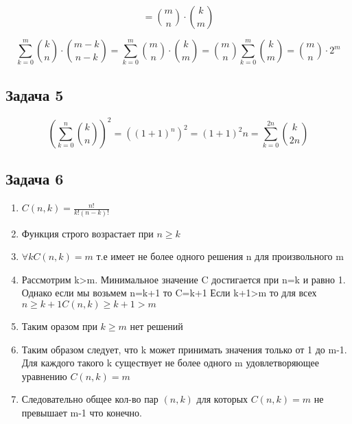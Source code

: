 \documentclass[a4paper,12pt]{article}
\begin{document}
\[
=\binom{m}{n}\cdot \binom{k}{m}
\]

\[
\sum_{k=0}^{m} \binom{k}{n}\cdot\binom{m-k}{n-k} = \sum_{k=0}^{m} \binom{m}{n}\cdot \binom{k}{m} = \binom{m}{n} \sum_{k=0}^{m} \binom{k}{m} = \binom{m}{n}\cdot 2^m
\]


\subsection{Задача 5}

\[
(\sum_{k=0}^{n} \binom{k}{n})^2 = ((1+1)^n)^2=(1+1)^2n= \sum_{k=0}^{2n} \binom{k}{2n}
\]

\subsection{Задача 6}
\begin{enumerate}
    \item $C(n, k) = \frac{n!}{k!(n-k)!}$
    \item Функция строго возрастает при $n\ge k$
    \item $\forall k C(n,k)=m$ т.е имеет не более одного решения n для произвольного m
    \item Рассмотрим k>m. Минимальное значение C достигается при n=k и равно 1. Однако если мы возьмем n=k+1 то C=k+1 Если k+1>m то для всех $n\ge k+1 C(n, k) \ge k+1 > m$
    \item Таким оразом при $k\ge m $ нет решений
    \item Таким образом следует, что k может принимать значения только от 1 до m-1. Для каждого такого k существует не более одного m удовлетворяющее уравнению $C(n, k)=m$
    \item Следовательно общее кол-во пар $(n, k)$ для которых $C(n, k)=m$ не превышает m-1 что конечно. 
\end{enumerate}
\end{document}
